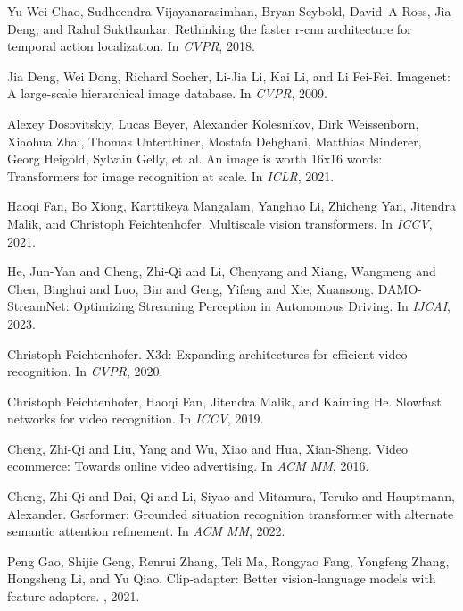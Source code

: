 \documentclass[10pt,twocolumn,letterpaper]{article}
\begin{document}
{\begin{thebibliography}{10}
Yu-Wei Chao, Sudheendra Vijayanarasimhan, Bryan Seybold, David~A Ross, Jia
  Deng, and Rahul Sukthankar.
\newblock Rethinking the faster r-cnn architecture for temporal action
  localization.
\newblock In {\em CVPR}, 2018.

Jia Deng, Wei Dong, Richard Socher, Li-Jia Li, Kai Li, and Li Fei-Fei.
\newblock Imagenet: A large-scale hierarchical image database.
\newblock In {\em CVPR}, 2009.

Alexey Dosovitskiy, Lucas Beyer, Alexander Kolesnikov, Dirk Weissenborn,
  Xiaohua Zhai, Thomas Unterthiner, Mostafa Dehghani, Matthias Minderer, Georg
  Heigold, Sylvain Gelly, et~al.
\newblock An image is worth 16x16 words: Transformers for image recognition at
  scale.
\newblock In {\em ICLR}, 2021.

Haoqi Fan, Bo Xiong, Karttikeya Mangalam, Yanghao Li, Zhicheng Yan, Jitendra
  Malik, and Christoph Feichtenhofer.
\newblock Multiscale vision transformers.
\newblock In {\em ICCV}, 2021.

He, Jun-Yan and Cheng, Zhi-Qi and Li, Chenyang and Xiang, Wangmeng and Chen, Binghui and Luo, Bin and Geng, Yifeng and Xie, Xuansong.
\newblock DAMO-StreamNet: Optimizing Streaming Perception in Autonomous Driving.
\newblock In {\em IJCAI}, 2023.

Christoph Feichtenhofer.
\newblock X3d: Expanding architectures for efficient video recognition.
\newblock In {\em CVPR}, 2020.

Christoph Feichtenhofer, Haoqi Fan, Jitendra Malik, and Kaiming He.
\newblock Slowfast networks for video recognition.
\newblock In {\em ICCV}, 2019.

Cheng, Zhi-Qi and Liu, Yang and Wu, Xiao and Hua, Xian-Sheng.
\newblock Video ecommerce: Towards online video advertising.
\newblock In {\em ACM MM}, 2016.

Cheng, Zhi-Qi and Dai, Qi and Li, Siyao and Mitamura, Teruko and Hauptmann, Alexander.
\newblock Gsrformer: Grounded situation recognition transformer with alternate semantic attention refinement.
\newblock In {\em ACM MM}, 2022.

Peng Gao, Shijie Geng, Renrui Zhang, Teli Ma, Rongyao Fang, Yongfeng Zhang,
  Hongsheng Li, and Yu Qiao.
\newblock Clip-adapter: Better vision-language models with feature adapters.
, 2021.


\end{thebibliography}}
\end{document}
